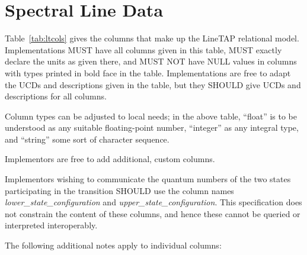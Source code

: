 \documentclass[11pt,a4paper]{ivoa}
\begin{document}
\section{Spectral Line Data}\label{sect:quantities}

Table~\ref{tab:ltcols} gives the columns that make up the LineTAP
relational model.  Implementations MUST have all columns given in this
table, MUST exactly declare the units as given there, and MUST NOT have
NULL values in columns with types printed in bold face in the table.
Implementations are free to adapt the UCDs and descriptions given in the
table, but they SHOULD give UCDs and descriptions for all columns.

Column types can be adjusted to local needs; in the
above table, ``float'' is to be understood as any suitable
floating-point number, ``integer'' as any integral type, and ``string''
some sort of character sequence.

Implementors are free to add additional, custom columns.

Implementors wishing to communicate the quantum numbers of the two
states participating in the transition SHOULD use the column names
\textit{lo\-wer\_sta\-te\_configuration} and
\textit{up\-per\_sta\-te\_configuration}.  This specification does not
constrain the content of these columns, and hence these cannot be
queried or interpreted interoperably.

The following additional notes apply to individual columns:
\end{document}
